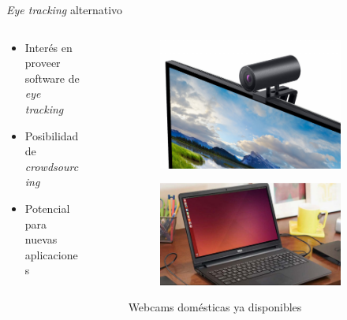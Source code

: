 \documentclass[aspectratio=169]{beamer}
\begin{document}
\begin{frame}{\textit{Eye tracking} alternativo}

  \begin{columns}
    \begin{column}{0.4\textwidth}
      \begin{itemize}
        \item Interés en proveer software de \textit{eye tracking}

        \item Posibilidad de \textit{crowdsourcing}

        \item Potencial para nuevas aplicaciones
      \end{itemize}

    \end{column}
    \begin{column}{0.6\textwidth}

      \begin{figure}
        \begin{subfigure}{0.49\textwidth}
          \centering
          \includegraphics[width=0.8\linewidth]{img/external-webcam.jpg}
        \end{subfigure}
        \begin{subfigure}{0.49\textwidth}
          \centering
          \includegraphics[width=0.8\linewidth]{img/notebook.jpg}
        \end{subfigure}
        \caption{Webcams domésticas ya disponibles}
      \end{figure}


\end{column}
\end{columns}
\end{frame}
\end{document}
